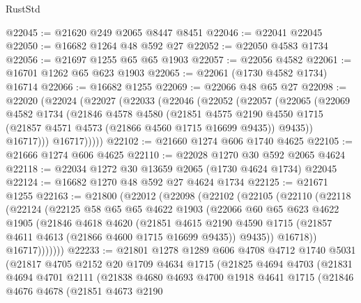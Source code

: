 \begin{lexlean}{RustStd}
\begin{coremodule}
@22045 := @21620 @249 @2065 @8447 @8451
@22046 := @22041 @22045
@22050 := @16682 @1264 @48 @592 @27
@22052 := @22050 @4583 @1734
@22056 := @21697 @1255 @65 @65 @1903
@22057 := @22056 @4582
@22061 := @16701 @1262 @65 @623 @1903
@22065 := @22061 (@1730 @4582 @1734) @16714
@22066 := @16682 @1255
@22069 := @22066 @48 @65 @27
@22098 := @22020
    (@22024
      (@22027
        (@22033
          (@22046
            (@22052
              (@22057
                (@22065
                  (@22069
                    @4582
                    @1734
                    (@21846
                      @4578
                      @4580
                      (@21851
                        @4575
                        @2190
                        @4550
                        @1715
                        (@21857 @4571 @4573 (@21866 @4560 @1715 @16699 @9435))
                        @9435))
                    @16717)))
              @16717)))))
@22102 := @21660 @1274 @606 @1740 @4625
@22105 := @21666 @1274 @606 @4625
@22110 := @22028 @1270 @30 @592 @2065 @4624
@22118 := @22034 @1272 @30 @13659 @2065 (@1730 @4624 @1734) @22045
@22124 := @16682 @1270 @48 @592 @27 @4624 @1734
@22125 := @21671 @1255
@22163 := @21800
    (@22012
      (@22098
        (@22102
          (@22105
            (@22110
              (@22118
                (@22124
                  (@22125
                    @58
                    @65
                    @65
                    @4622
                    @1903
                    (@22066
                      @60
                      @65
                      @623
                      @4622
                      @1905
                      (@21846
                        @4618
                        @4620
                        (@21851
                          @4615
                          @2190
                          @4590
                          @1715
                          (@21857 @4611 @4613 (@21866 @4600 @1715 @16699 @9435))
                          @9435))
                      @16718))
                  @16717)))))))
@22233 := @21801
    @1278
    @1289
    @606
    @4708
    @4712
    @1740
    @5031
    (@21817
      @4705
      @2152
      @20
      @1709
      @4634
      @1715
      (@21825
        @4694
        @4703
        (@21831
          @4694
          @4701
          @2111
          (@21838
            @4680
            @4693
            @4700
            @1918
            @4641
            @1715
            (@21846
              @4676
              @4678
              (@21851
                @4673
                @2190

\end{coremodule}
\end{lexlean}
